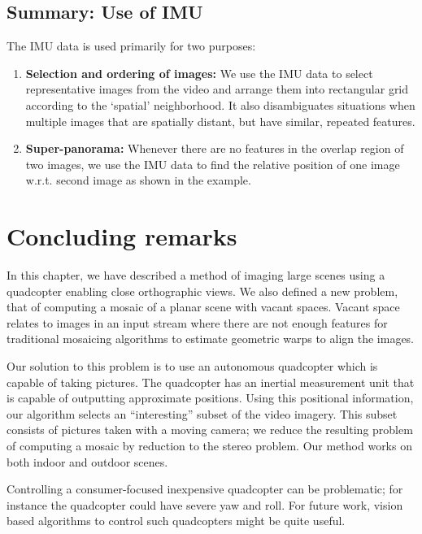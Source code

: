 \subsection{Summary: Use of IMU}
The IMU data is used primarily for two purposes:
\begin{enumerate}
\item \textbf{Selection and ordering of images:} We use the IMU data
  to select representative images from the video and arrange them into
  rectangular grid according to the `spatial' neighborhood. It also
  disambiguates situations when multiple images that are spatially
  distant, but have similar, repeated features.

\item \textbf{Super-panorama:} Whenever there are no features in
  the overlap region of two images, we use the IMU data to find the
  relative position of one image w.r.t. second image as shown in the
  example. 
\end{enumerate}


\section{Concluding remarks}

In this chapter, we have described a method of imaging large scenes
using a quadcopter enabling close orthographic views. We also defined
a new problem, that of computing a mosaic of a planar scene with
vacant spaces.  Vacant space relates to images in an input stream
where there are not enough features for traditional mosaicing
algorithms to estimate geometric warps to align the images.

Our solution to this problem is to use an autonomous quadcopter which
is capable of taking pictures.  The quadcopter has an inertial
measurement unit that is capable of outputting approximate
positions. Using this positional information, our algorithm selects an
``interesting'' subset of the video imagery.  This subset consists of
pictures taken with a moving camera; we reduce the resulting
problem of computing a mosaic by reduction to the stereo problem.  Our
method works on both indoor and outdoor scenes.

Controlling a consumer-focused inexpensive quadcopter can be
problematic; for instance the quadcopter could have severe yaw and
roll.  For future work, vision based algorithms to control such
quadcopters might be quite useful.
